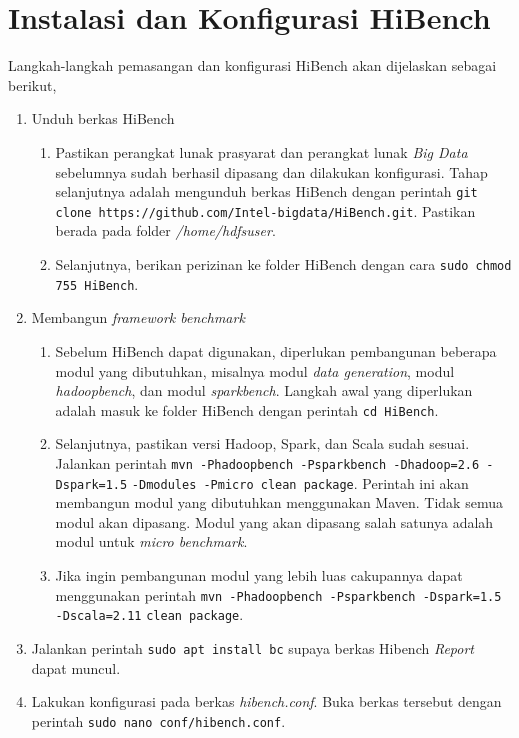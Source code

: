 \chapter{Instalasi dan Konfigurasi HiBench}
\label{appendix:E}

Langkah-langkah pemasangan dan konfigurasi HiBench akan dijelaskan sebagai berikut,

\begin{enumerate}
  \item Unduh berkas HiBench
  \begin{enumerate}
    \item Pastikan perangkat lunak prasyarat dan perangkat lunak \textit{Big Data} sebelumnya sudah berhasil dipasang dan dilakukan konfigurasi. Tahap selanjutnya adalah mengunduh berkas HiBench dengan perintah \verb|git clone https://github.com/Intel-bigdata/HiBench.git|. Pastikan berada pada folder \textit{/home/hdfsuser}.
    \item Selanjutnya, berikan perizinan ke folder HiBench dengan cara \verb|sudo chmod 755 HiBench|.
  \end{enumerate}
  \item Membangun \textit{framework benchmark}
  \begin{enumerate}
    \item Sebelum HiBench dapat digunakan, diperlukan pembangunan beberapa modul yang dibutuhkan, misalnya modul \textit{data generation}, modul \textit{hadoopbench}, dan modul \textit{sparkbench}. Langkah awal yang diperlukan adalah masuk ke folder HiBench dengan perintah \verb|cd HiBench|.
    \item Selanjutnya, pastikan versi Hadoop, Spark, dan Scala sudah sesuai. Jalankan perintah \verb|mvn -Phadoopbench -Psparkbench -Dhadoop=2.6 -Dspark=1.5| \newline \verb|-Dmodules -Pmicro clean package|. Perintah ini akan membangun modul yang dibutuhkan menggunakan Maven. Tidak semua modul akan dipasang. Modul yang akan dipasang salah satunya adalah modul untuk \textit{micro benchmark}. 
    \item Jika ingin pembangunan modul yang lebih luas cakupannya dapat menggunakan perintah \verb|mvn -Phadoopbench -Psparkbench -Dspark=1.5 -Dscala=2.11| \newline \verb|clean package|.
  \end{enumerate}
  \item Jalankan perintah \verb |sudo apt install bc| supaya berkas Hibench \textit{Report} dapat muncul. 
  \item Lakukan konfigurasi pada berkas \textit{hibench.conf}. Buka berkas tersebut dengan perintah \verb|sudo nano conf/hibench.conf|.

\end{enumerate}

